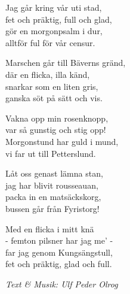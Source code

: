 \vspace{10pt}
Jag går kring vår uti stad,\\
fet och präktig, full och glad,\\
gör en morgonpsalm i dur,\\
alltför ful för vår censur.\par
\vspace{10pt}
Marschen går till Bäverns gränd,\\
där en flicka, illa känd,\\
snarkar som en liten gris,\\
ganska söt på sätt och vis.\par
\vspace{10pt}
Vakna opp min rosenknopp,\\
var så gunstig och stig opp!\\
Morgonstund har guld i mund,\\
vi far ut till Petterslund.\par
\vspace{10pt}
Låt oss genast lämna stan,\\
jag har blivit rousseauan,\\
packa in en matsäckskorg,\\
bussen går från Fyristorg!\par
\vspace{10pt}
Med en flicka i mitt knä\\
- femton pilsner har jag me’ -\\
far jag genom Kungsängstull,\\
fet och präktig, glad och full.\par
\vspace{10pt}
{\footnotesize\textit{Text \& Musik: Ulf Peder Olrog}}
